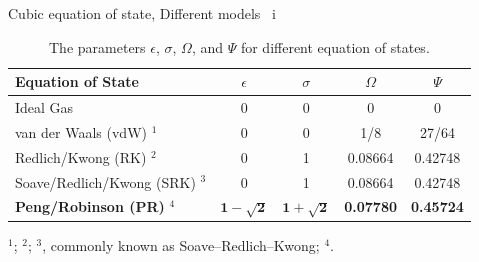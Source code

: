 %
%
%
%
%
\begin{frame}{Cubic equation of state, Different models \, i}

\begin{table}
\begin{tabular*}{1\textwidth}{@{\extracolsep{\fill}}lcccc}
\toprule 
Equation of State & $\epsilon$ & $\sigma$ & $\Omega$ & $\Psi$\tabularnewline
\midrule 
Ideal Gas & 0 & 0 & 0 & 0\tabularnewline
van der Waals (vdW) $^{1}$ \citeyearpar{VanderWaals1873} & 0 & 0 & 1/8 & 27/64\tabularnewline
Redlich/Kwong (RK) $^{2}$ \citeyearpar{Redlich1949} & 0 & 1 & 0.08664 & 0.42748\tabularnewline
Soave/Redlich/Kwong (SRK) $^{3}$ \citeyearpar{Soave1972} & 0 & 1 & 0.08664 & 0.42748\tabularnewline
\textbf{Peng/Robinson (PR)} $^{4}$ \citeyearpar{Peng1976} & $\mathbf{1-\sqrt{2}}$ & $\mathbf{1+\sqrt{2}}$ & \textbf{0.07780} & \textbf{0.45724} \tabularnewline
\bottomrule
\end{tabular*}

\footnotesize

$^{1}$\citet{VanderWaals1873}; 
$^{2}$\citet{Redlich1949};
$^{3}$\citet{Soave1972}, commonly known as Soave--Redlich--Kwong;
$^{4}$\citet{Peng1976}.

\caption{\normalsize The parameters $\epsilon$, $\sigma$, $\Omega$, and $\Psi$ for different
equation of states.}
\end{table}

\end{frame}
